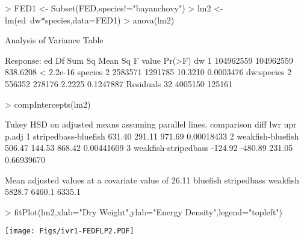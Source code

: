 \documentclass[a4paper]{article}
\begin{document}
\begin{Schunk}
\begin{Sinput}
> FED1 <- Subset(FED,species!="bayanchovy")
> lm2 <- lm(ed~dw*species,data=FED1)
> anova(lm2)
\end{Sinput}
\begin{Soutput}
Analysis of Variance Table

Response: ed
           Df    Sum Sq   Mean Sq  F value    Pr(>F)
dw          1 104962559 104962559 838.6208 < 2.2e-16
species     2   2583571   1291785  10.3210 0.0003476
dw:species  2    556352    278176   2.2225 0.1247887
Residuals  32   4005150    125161                   
\end{Soutput}
\begin{Sinput}
> compIntercepts(lm2)
\end{Sinput}
\begin{Soutput}
Tukey HSD on adjusted means assuming parallel lines.
            comparison    diff     lwr    upr      p.adj
1 stripedbass-bluefish  631.40  291.11 971.69 0.00018433
2    weakfish-bluefish  506.47  144.53 868.42 0.00441609
3 weakfish-stripedbass -124.92 -480.89 231.05 0.66939670

Mean adjusted values at a covariate value of 26.11 
   bluefish stripedbass    weakfish 
     5828.7      6460.1      6335.1 
\end{Soutput}
\end{Schunk}

\begin{Schunk}
\begin{Sinput}
> fitPlot(lm2,xlab="Dry Weight",ylab="Energy Density",legend="topleft")
\end{Sinput}
\end{Schunk}
\texttt{[image: Figs/ivr1-FEDFLP2.PDF]}
\end{document}
